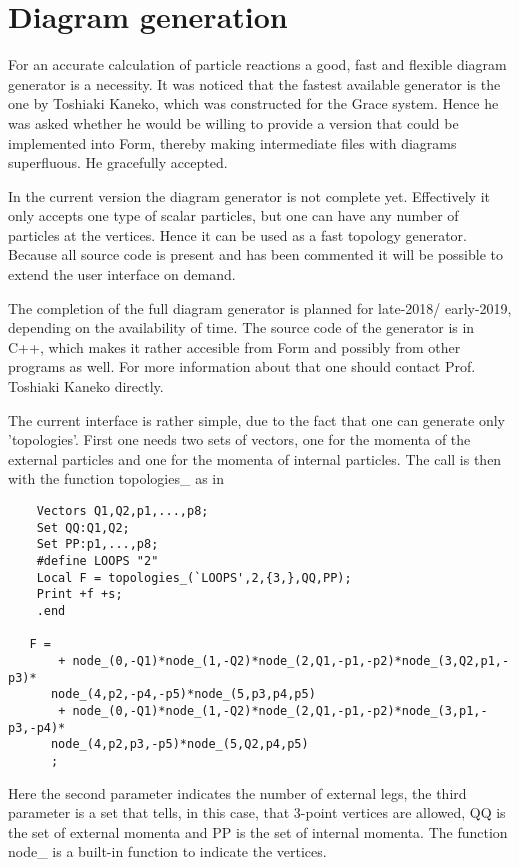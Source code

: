
\chapter{Diagram generation}
\label{diagrams}

For an accurate calculation of particle reactions a good, fast and flexible 
diagram generator is a necessity. It was noticed that the fastest available 
generator is the one by Toshiaki Kaneko, which was constructed for the 
Grace system. Hence he was asked whether he would be willing to provide a 
version that could be implemented into Form, thereby making intermediate 
files with diagrams superfluous. He gracefully accepted.

In the current version the diagram generator is not complete yet. 
Effectively it only accepts one type of scalar particles, but one can have 
any number of particles at the vertices. Hence it can be used as a fast 
topology generator. Because all source code is present and has been 
commented it will be possible to extend the user interface on demand.

The completion of the full diagram generator is planned for late-2018/ 
early-2019, depending on the availability of time. The source code of the 
generator is in C++, which makes it rather accesible from Form and possibly 
from other programs as well. For more information about that one should 
contact Prof. Toshiaki Kaneko directly.

The current interface is rather simple, due to the fact that one can 
generate only 'topologies'. First one needs two sets of vectors, one for 
the momenta of the external particles and one for the momenta of internal 
particles. The call is then with the function topologies\_ as in
\begin{verbatim}
    Vectors Q1,Q2,p1,...,p8;
    Set QQ:Q1,Q2;
    Set PP:p1,...,p8;
    #define LOOPS "2"
    Local F = topologies_(`LOOPS',2,{3,},QQ,PP);
    Print +f +s;
    .end

   F =
       + node_(0,-Q1)*node_(1,-Q2)*node_(2,Q1,-p1,-p2)*node_(3,Q2,p1,-p3)*
      node_(4,p2,-p4,-p5)*node_(5,p3,p4,p5)
       + node_(0,-Q1)*node_(1,-Q2)*node_(2,Q1,-p1,-p2)*node_(3,p1,-p3,-p4)*
      node_(4,p2,p3,-p5)*node_(5,Q2,p4,p5)
      ;
\end{verbatim}
Here the second parameter indicates the number of external legs, the third 
parameter is a set that tells, in this case, that 3-point vertices are 
allowed, QQ is the set of external momenta and PP is the set of internal 
momenta. The function node\_ is a built-in function to indicate the 
vertices.

